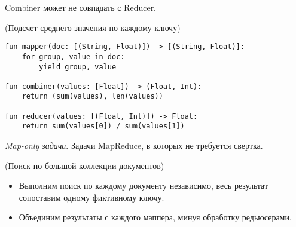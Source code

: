 \begin{remark} Combiner может не совпадать с Reducer.
\end{remark}

\begin{example}(Подсчет среднего значения по каждому ключу)
  \begin{lstlisting}
fun mapper(doc: [(String, Float)]) -> [(String, Float)]:
    for group, value in doc:
        yield group, value

fun combiner(values: [Float]) -> (Float, Int):
    return (sum(values), len(values))

fun reducer(values: [(Float, Int)]) -> Float:
    return sum(values[0]) / sum(values[1])
  \end{lstlisting}
\end{example}

\begin{definition}
  \textit{Map-only задачи}. Задачи MapReduce, в которых не требуется свертка.
\end{definition}

\begin{example}(Поиск по большой коллекции документов)
  \begin{itemize}
    \item Выполним поиск по каждому документу независимо, весь результат
      сопоставим одному фиктивному ключу.
    \item Объединим результаты с каждого маппера, минуя обработку редьюсерами.
  \end{itemize}
\end{example}

